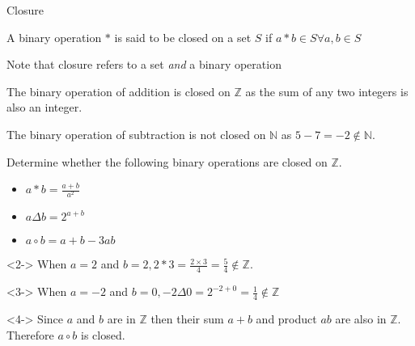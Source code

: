 \documentclass[8pt]{beamer}
\begin{document}
\begin{frame}{Closure}
	\begin{definition}
		A binary operation $*$ is said to be closed on a set $S$ if  $a*b\in S \forall a,b \in S$ 
	\end{definition}
	\alert<-1>{Note that closure refers to a set \emph{and} a binary operation}

	The binary operation of addition is closed on $\mathbb{Z}$ as the sum of any two integers is also an integer.

	The binary operation of subtraction is not closed on $\mathbb{N}$ as  $5-7=-2\not\in \mathbb{N}$.

	\begin{problem}
		Determine whether the following binary operations are closed on $\mathbb{Z}.$
		\begin{itemize}
			\item $a*b=\frac{a+b}{a^2}$ 
			\item $a\Delta b = 2^{a+b}$
			\item  $ a \circ b = a+b-3ab$
		\end{itemize}
	\end{problem}

	\begin{solution}<2->
		When $a=2$ and $b=2,2*3=\frac{2\times 3}{4}=\frac{5}{4}\not\in \mathbb{Z}$.	
	\end{solution}
	\begin{solution}<3->
		When $a=-2$ and $b=0,-2\Delta 0=2^{-2+0}=\frac{1}{4}\not\in \mathbb{Z}$
	\end{solution}
	\begin{solution}<4->
		Since $ a$ and $b$ are in $\mathbb{Z}$ then their sum $a+b$ and product $ab$ are also in $\mathbb{Z}$. Therefore $a\circ b$ is closed.
	\end{solution}
\end{frame}
\end{document}
